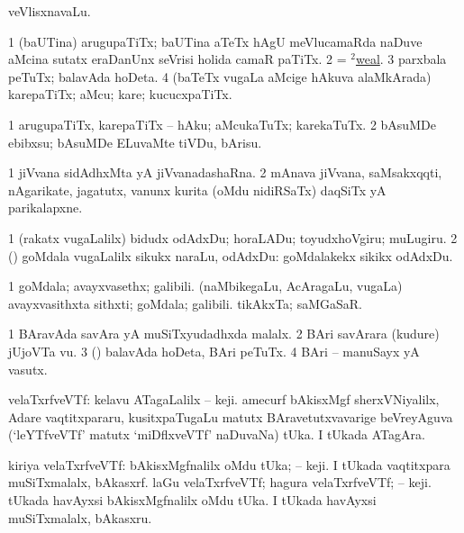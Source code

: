 \bentry
{} 
\gl{\nA}
\bmng
veVlisxnavaLu. 
\emng
\eentry

\bentry
{} 
\gl{\nA}
\expl{}
\bmng
\bnum
\num{1} (baUTina) arugupaTiTx; baUTina aTeTx hAgU meVlucamaRda naDuve aMcina sutatx eraDanUnx seVrisi holida camaR paTiTx. 
\num{2} = \hyperlink{weal(2)}{$^2$weal}. 
\num{3} parxbala peTuTx; balavAda hoDeta. 
\num{4} (baTeTx \mo vugaLa aMcige hAkuva alaMkArada) karepaTiTx; aMcu; kare; kucucxpaTiTx. 
\enum
\emng
\eentry

\bentry
{} 
\gl{\sakirx}
\expl{}
\bmng
\bnum
\num{1} arugupaTiTx, karepaTiTx -- hAku; aMcukaTuTx; karekaTuTx. 
\num{2} bAsuMDe ebibxsu; bAsuMDe ELuvaMte tiVDu, bArisu. 
\enum
\emng
\eentry

\bentry 
{} 
\gl{\nA}
\expl{\G}
\bmng
\bnum
\num{1} jiVvana sidAdhxMta yA jiVvanadashaRna. 
\num{2} mAnava jiVvana, saMsakxqqti, nAgarikate, jagatutx, \mo vanunx kurita (oMdu nidiRSaTx) daqSiTx yA parikalapxne. 
\enum
\emng
\eentry

\bentry
{} 
\gl{\akirx}
\expl{}
\bmng
\bnum
\num{1} (rakatx \mo vugaLalilx) bidudx odAdxDu; horaLADu; toyudxhoVgiru; muLugiru. 
\num{2} (\rUpa) goMdala \mo vugaLalilx sikukx naraLu, odAdxDu:  goMdalakekx sikikx odAdxDu. 
\enum
\emng
\eentry

\bentry
{} 
\gl{\nA}
\expl{}
\bmng
\bnum
\num{1} goMdala; avayxvasethx; galibili. 
 (naMbikegaLu, AcAragaLu, \mo vugaLa) 
\banum
{} avayxvasithxta sithxti; goMdala; galibili. 
 tikAkxTa; saMGaSaR. 
\eanum
\numie
\enum
\emng
\eentry

\bentry
{} 
\gl{\nA}
\expl{}
\bmng
\bnum
\num{1} BAravAda savAra yA muSiTxyudadhxda malalx. 
\num{2} BAri savArara (kudure) jUjoVTa \mo vu. 
\num{3} (\AmA) balavAda hoDeta, BAri peTuTx. 
\num{4} BAri -- manuSayx yA vasutx. 
\enum
\emng
\eentry

\bentry 
{} 
\gl{\nA}
\expl{}
\bmng
velaTxrfveVTf: 
\banum
{} kelavu ATagaLalilx  -- keji. amecurf bAkisxMgf sherxVNiyalilx, Adare vaqtitxpararu, kusitxpaTugaLu matutx BAravetutxvavarige beVreyAguva (`leYTfveVTf' matutx `miDflxveVTf' naDuvaNa) tUka. 
 I tUkada ATagAra. 
\eanum
\emng

\noindent 
\gl{\pagu}
\expl{}
\bmng
\bnum
{}  kiriya velaTxrfveVTf: 
\banum
{} bAkisxMgfnalilx oMdu tUka;  --  keji. 
 I tUkada vaqtitxpara muSiTxmalalx, bAkasxrf. 
\eanum
\numie
{}  
\banum
{} laGu velaTxrfveVTf; hagura velaTxrfveVTf;  --  keji. tUkada havAyxsi bAkisxMgfnalilx oMdu tUka. 
 I tUkada havAyxsi muSiTxmalalx, bAkasxru. 
\eanum
\numie
\enum
\emng
\eentry

